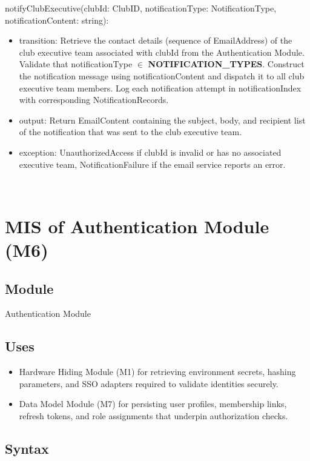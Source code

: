 \documentclass[12pt, titlepage]{article}
\begin{document}
\noindent notifyClubExecutive(clubId: ClubID, notificationType: NotificationType, notificationContent: string):
\begin{itemize}
  \item transition: Retrieve the contact details (sequence of EmailAddress) of the club executive team associated with clubId from the Authentication Module. Validate that notificationType $\in$ \textbf{NOTIFICATION\_TYPES}. Construct the notification message using notificationContent and dispatch it to all club executive team members. Log each notification attempt in notificationIndex with corresponding NotificationRecords.
  \item output: Return EmailContent containing the subject, body, and recipient list of the notification that was sent to the club executive team.
  \item exception: UnauthorizedAccess if clubId is invalid or has no associated executive team, NotificationFailure if the email service reports an error.
\end{itemize}


~\newpage

\section{MIS of Authentication Module (M6)} \label{ModuleAuthentication}

\subsection{Module}

Authentication Module

\subsection{Uses}

\begin{itemize}
  \item Hardware Hiding Module (M1) for retrieving environment secrets, hashing parameters, and SSO adapters required to validate identities securely.
  \item Data Model Module (M7) for persisting user profiles, membership links, refresh tokens, and role assignments that underpin authorization checks.
\end{itemize}

\subsection{Syntax}
\end{document}
